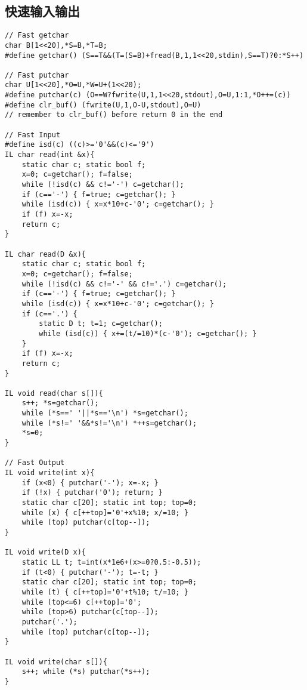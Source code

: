 \documentclass{article}
\begin{document}
\subsection{快速输入输出}
\begin{lstlisting}
// Fast getchar
char B[1<<20],*S=B,*T=B;
#define getchar() (S==T&&(T=(S=B)+fread(B,1,1<<20,stdin),S==T)?0:*S++)

// Fast putchar
char U[1<<20],*O=U,*W=U+(1<<20);
#define putchar(c) (O==W?fwrite(U,1,1<<20,stdout),O=U,1:1,*O++=(c))
#define clr_buf() (fwrite(U,1,O-U,stdout),O=U)
// remember to clr_buf() before return 0 in the end

// Fast Input
#define isd(c) ((c)>='0'&&(c)<='9')
IL char read(int &x){
	static char c; static bool f;
	x=0; c=getchar(); f=false;
	while (!isd(c) && c!='-') c=getchar();
	if (c=='-') { f=true; c=getchar(); }
	while (isd(c)) { x=x*10+c-'0'; c=getchar(); }
	if (f) x=-x;
	return c;
}

IL char read(D &x){
	static char c; static bool f;
	x=0; c=getchar(); f=false;
	while (!isd(c) && c!='-' && c!='.') c=getchar();
	if (c=='-') { f=true; c=getchar(); }
	while (isd(c)) { x=x*10+c-'0'; c=getchar(); }
	if (c=='.') {
		static D t; t=1; c=getchar();
		while (isd(c)) { x+=(t/=10)*(c-'0'); c=getchar(); }
	}
	if (f) x=-x;
	return c;
}

IL void read(char s[]){
	s++; *s=getchar();
	while (*s==' '||*s=='\n') *s=getchar();
	while (*s!=' '&&*s!='\n') *++s=getchar();
	*s=0;
}

// Fast Output
IL void write(int x){
	if (x<0) { putchar('-'); x=-x; }
	if (!x) { putchar('0'); return; }
	static char c[20]; static int top; top=0;
	while (x) { c[++top]='0'+x%10; x/=10; }
	while (top) putchar(c[top--]);
}

IL void write(D x){
	static LL t; t=int(x*1e6+(x>=0?0.5:-0.5));
	if (t<0) { putchar('-'); t=-t; }
	static char c[20]; static int top; top=0;
	while (t) { c[++top]='0'+t%10; t/=10; }
	while (top<=6) c[++top]='0';
	while (top>6) putchar(c[top--]);
	putchar('.');
	while (top) putchar(c[top--]);
}

IL void write(char s[]){
	s++; while (*s) putchar(*s++);
}
\end{lstlisting}
\end{document}
